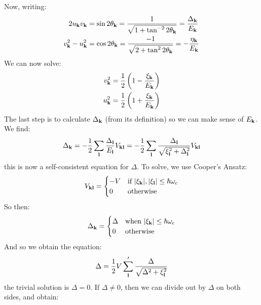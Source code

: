 Now, writing:
\begin{equation}
    \begin{split}
        2u_{\mathbf{k}}v_{\mathbf{k}} &= \sin2\theta_{\mathbf{k}} = \frac{1}{\sqrt{1 + \tan^{-2}2\theta_{\mathbf{k}}}} = \frac{\Delta_{\mathbf{k}}}{E_{\mathbf{k}}}
        \\ v_{\mathbf{k}}^2 - u_{\mathbf{k}}^2 &= \cos2\theta_{\mathbf{k}} = \frac{-1}{\sqrt{2 + \tan^22\theta_{\mathbf{k}}}} = -\frac{\eta_{\mathbf{k}}}{E_{\mathbf{k}}}
    \end{split}
\end{equation}
We can now solve:
\begin{equation}
    \begin{split}
        v_{\mathbf{k}}^2 &= \frac{1}{2}\left(1 - \frac{\xi_{\mathbf{k}}}{E_{\mathbf{k}}}\right)
        \\ u_{\mathbf{k}}^2 &= \frac{1}{2}\left(1 + \frac{\xi_{\mathbf{k}}}{E_{\mathbf{k}}}\right)
    \end{split}
\end{equation}
The last step is to calculate $\Delta_{\mathbf{k}}$ (from its definition) so we can make sense of $E_{\mathbf{k}}$. We find:
\begin{equation}
    \Delta_{\mathbf{k}} =-\frac{1}{2}\sum_{\mathbf{l}} \frac{\Delta_{\mathbf{l}}}{E_{\mathbf{l}}}V_{\mathbf{k}\mathbf{l}} = -\frac{1}{2}\sum_{\mathbf{l}}\frac{\Delta_{\mathbf{l}}}{\sqrt{\xi_{\mathbf{l}}^2 + \Delta_{\mathbf{l}}^2}}V_{\mathbf{k}\mathbf{l}}
\end{equation}
this is now a self-consistent equation for $\Delta$. To solve, we use Cooper's Ansatz:
\begin{equation}
    V_{\mathbf{k}\mathbf{l}} = \begin{cases}
        -V & \text{if $\lvert \xi_{\mathbf{k}} \rvert, \lvert \xi_{\mathbf{l}} \rvert \leq \hbar \omega_c$}
        \\ 0 & \text{otherwise}
    \end{cases}
\end{equation}
So then:
\begin{equation}
    \Delta_{\mathbf{k}} = \begin{cases}
        \Delta & \text{when $\lvert \xi_{\mathbf{k}} \rvert \leq \hbar\omega_c$}
        \\ 0 & \text{otherwise}
    \end{cases}
\end{equation}
And so we obtain the equation:
\begin{equation}
    \Delta = \frac{1}{2}V\sum_{\mathbf{l}}' \frac{\Delta}{\sqrt{\Delta^2 + \xi_{\mathbf{l}}^2}}
\end{equation}
the trivial solution is $\Delta = 0$. If $\Delta \neq 0$, then we can divide out by $\Delta$ on both sides, and obtain:
